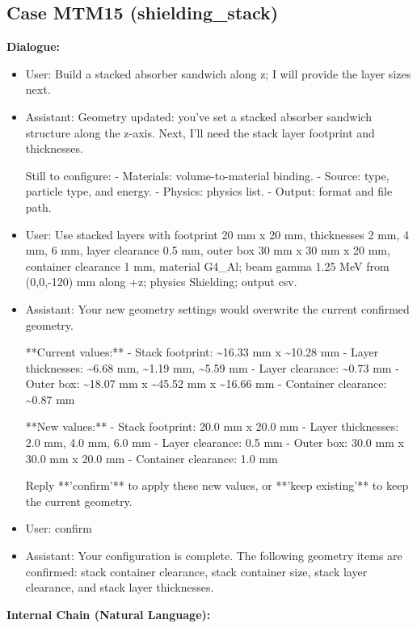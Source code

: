 \documentclass[11pt]{ctexart}
\begin{document}
\subsection{Case MTM15 (shielding\_stack)}
\textbf{Dialogue:}
\begin{itemize}
\item User: Build a stacked absorber sandwich along z; I will provide the layer sizes next.
\item Assistant: Geometry updated: you've set a stacked absorber sandwich structure along the z-axis. Next, I'll need the stack layer footprint and thicknesses.

Still to configure:
- Materials: volume-to-material binding.
- Source: type, particle type, and energy.
- Physics: physics list.
- Output: format and file path.
\item User: Use stacked layers with footprint 20 mm x 20 mm, thicknesses 2 mm, 4 mm, 6 mm, layer clearance 0.5 mm, outer box 30 mm x 30 mm x 20 mm, container clearance 1 mm, material G4\_Al; beam gamma 1.25 MeV from (0,0,-120) mm along +z; physics Shielding; output csv.
\item Assistant: Your new geometry settings would overwrite the current confirmed geometry.

**Current values:**
- Stack footprint: \textasciitilde{}16.33 mm x \textasciitilde{}10.28 mm
- Layer thicknesses: \textasciitilde{}6.68 mm, \textasciitilde{}1.19 mm, \textasciitilde{}5.59 mm
- Layer clearance: \textasciitilde{}0.73 mm
- Outer box: \textasciitilde{}18.07 mm x \textasciitilde{}45.52 mm x \textasciitilde{}16.66 mm
- Container clearance: \textasciitilde{}0.87 mm

**New values:**
- Stack footprint: 20.0 mm x 20.0 mm
- Layer thicknesses: 2.0 mm, 4.0 mm, 6.0 mm
- Layer clearance: 0.5 mm
- Outer box: 30.0 mm x 30.0 mm x 20.0 mm
- Container clearance: 1.0 mm

Reply **'confirm'** to apply these new values, or **'keep existing'** to keep the current geometry.
\item User: confirm
\item Assistant: Your configuration is complete. The following geometry items are confirmed: stack container clearance, stack container size, stack layer clearance, and stack layer thicknesses.
\end{itemize}
\textbf{Internal Chain (Natural Language):}
\end{document}
